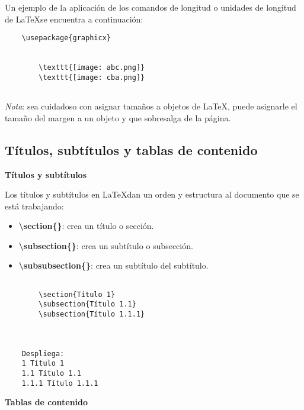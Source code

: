 Un ejemplo de la aplicación de los comandos de longitud o unidades de longitud de \LaTeX se encuentra a continuación:
\begin{lstlisting}
    \usepackage{graphicx}
    
    
        \texttt{[image: abc.png]}
        \texttt{[image: cba.png]}
    
\end{lstlisting}

\textit{Nota}: sea cuidadoso con asignar tamaños a objetos de \LaTeX, puede asignarle el tamaño del margen a un objeto y que sobresalga de la página.


\subsection{Títulos, subtítulos y tablas de contenido}

\textbf{Títulos y subtítulos}

Los títulos y subtítulos en \LaTeX  dan un orden y estructura al documento que se está trabajando:
\begin{itemize}
    \item \textbf{\textbackslash{section}\{\}}: crea un título o sección.
    \item \textbf{\textbackslash{subsection\{\}}}: crea un subtítulo o subsección.
    \item \textbf{\textbackslash{subsubsection\{\}}}: crea un subtítulo del subtítulo.
\end{itemize}
\begin{lstlisting}
    
        \section{Título 1}
        \subsection{Título 1.1}
        \subsection{Título 1.1.1}
    
    
    
    Despliega:
    1 Título 1
    1.1 Título 1.1
    1.1.1 Título 1.1.1
\end{lstlisting}

\textbf{Tablas de contenido}

